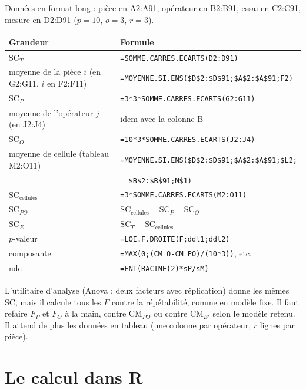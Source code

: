 \documentclass[11pt,a4paper]{article}
\theoremstyle{sj}
\theoremstyle{definition}
\theoremstyle{remark}
\newcommand{\SC}{\mathrm{SC}}
\newcommand{\CM}{\mathrm{CM}}
\providecommand{\og}{\guillemotleft\nobreakspace}
\providecommand{\fg}{\nobreakspace\guillemotright}
\newcommand{\nosp}[1]{{\XeTeXinterchartokenstate=0 #1}}
\begin{document}
Données en format long : pièce en \nosp{A2:A91}, opérateur en \nosp{B2:B91}, essai en \nosp{C2:C91}, mesure en \nosp{D2:D91} ($p=10$, $o=3$, $r=3$).

\begin{center}
\footnotesize
\begin{tabular}{p{4.2cm} l}
\toprule
Grandeur & Formule\\
\midrule
$\SC_T$ & \texttt{=SOMME.CARRES.ECARTS(D2:D91)}\\
moyenne de la pièce $i$ (en \nosp{G2:G11}, $i$ en \nosp{F2:F11}) & \texttt{=MOYENNE.SI.ENS(\$D\$2:\$D\$91;\$A\$2:\$A\$91;F2)}\\
$\SC_P$ & \texttt{=3*3*SOMME.CARRES.ECARTS(G2:G11)}\\
moyenne de l'opérateur $j$ (en \nosp{J2:J4}) & idem avec la colonne B\\
$\SC_O$ & \texttt{=10*3*SOMME.CARRES.ECARTS(J2:J4)}\\
moyenne de cellule (tableau \nosp{M2:O11}) & \texttt{=MOYENNE.SI.ENS(\$D\$2:\$D\$91;\$A\$2:\$A\$91;\$L2;}\\ & \texttt{\ \ \$B\$2:\$B\$91;M\$1)}\\
$\SC_{\text{cellules}}$ & \texttt{=3*SOMME.CARRES.ECARTS(M2:O11)}\\
$\SC_{PO}$ & $\SC_{\text{cellules}}-\SC_P-\SC_O$\\
$\SC_E$ & $\SC_T-\SC_{\text{cellules}}$\\
$p$-valeur & \texttt{=LOI.F.DROITE(F;ddl1;ddl2)}\\
composante & \texttt{=MAX(0;(CM\_O-CM\_PO)/(10*3))}, etc.\\
ndc & \texttt{=ENT(RACINE(2)*sP/sM)}\\
\bottomrule
\end{tabular}
\end{center}

L'utilitaire d'analyse (\og Anova : deux facteurs avec réplication\fg{}) donne les mêmes SC, mais il calcule tous les $F$ contre la répétabilité, comme en modèle fixe. Il faut refaire $F_P$ et $F_O$ à la main, contre $\CM_{PO}$ ou contre $\CM_{E'}$ selon le modèle retenu. Il attend de plus les données en tableau (une colonne par opérateur, $r$ lignes par pièce).

\section{Le calcul dans R}\label{sec:R}
\end{document}
